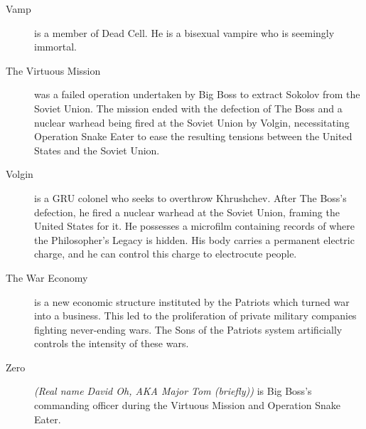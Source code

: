 \documentclass[12pt]{article}
\begin{document}
\begin{description}
	\item [Vamp] is a member of Dead Cell. He is a bisexual vampire who is
		seemingly immortal.

	\item [The Virtuous Mission] was a failed operation undertaken by Big
		Boss to extract Sokolov from the Soviet Union. The mission
		ended with the defection of The Boss and a nuclear warhead
		being fired at the Soviet Union by Volgin, necessitating
		Operation Snake Eater to ease the resulting tensions between
		the United States and the Soviet Union.

	\item [Volgin] is a GRU colonel who seeks to overthrow Khrushchev.
		After The Boss's defection, he fired a nuclear warhead at the
		Soviet Union, framing the United States for it. He possesses a
		microfilm containing records of where the Philosopher's Legacy
		is hidden. His body carries a permanent electric charge, and he
		can control this charge to electrocute people.
	
	\item [The War Economy] is a new economic structure instituted by the
		Patriots which turned war into a business. This led to the
		proliferation of private military companies fighting
		never-ending wars. The Sons of the Patriots system artificially
		controls the intensity of these wars.

	\item [Zero] \textit{(Real name David Oh, AKA Major Tom (briefly))} is
		Big Boss's commanding officer during the Virtuous Mission and
		Operation Snake Eater.
\end{description}

\newpage
\end{document}
